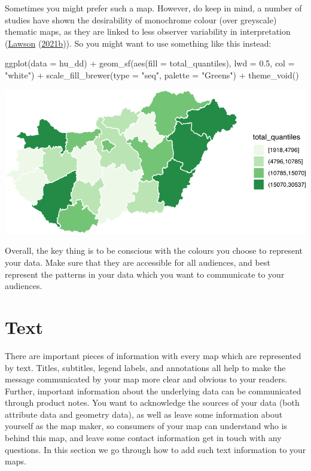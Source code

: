 \documentclass[
  krantz2]{krantz}
\makeatletter
\newenvironment{Shaded}{\begin{snugshade}}{\end{snugshade}}
\newcommand{\AttributeTok}[1]{\textcolor[rgb]{0.61,0.61,0.61}{#1}}
\newcommand{\FloatTok}[1]{\textcolor[rgb]{0.06,0.06,0.06}{#1}}
\newcommand{\FunctionTok}[1]{\textcolor[rgb]{0,0,0}{#1}}
\newcommand{\NormalTok}[1]{#1}
\newcommand{\SpecialCharTok}[1]{\textcolor[rgb]{0,0,0}{#1}}
\newcommand{\StringTok}[1]{\textcolor[rgb]{0.5,0.5,0.5}{#1}}
\newenvironment{kframe}{%
\medskip{}
\setlength{\fboxsep}{.8em}
 \def\at@end@of@kframe{}%
 \ifinner\ifhmode%
  \def\at@end@of@kframe{\end{minipage}}%
  \begin{minipage}{\columnwidth}%
 \fi\fi%
 \def\FrameCommand##1{\hskip\@totalleftmargin \hskip-\fboxsep
 \colorbox{shadecolor}{##1}\hskip-\fboxsep
     \hskip-\linewidth \hskip-\@totalleftmargin \hskip\columnwidth}%
 \MakeFramed {\advance\hsize-\width
   \@totalleftmargin\z@ \linewidth\hsize
   \@setminipage}}%
 {\par\unskip\endMakeFramed%
 \at@end@of@kframe}
\renewenvironment{Shaded}{\begin{kframe}}{\end{kframe}}
\makeatother
\begin{document}
Sometimes you might prefer such a map. However, do keep in mind, a number of studies have shown the desirability of monochrome colour (over greyscale) thematic maps, as they are linked to less observer variability in interpretation (\protect\hyperlink{ref-Lawson_2006}{Lawson} (\protect\hyperlink{ref-Lawson_2006}{2021b})). So you might want to use something like this instead:

\begin{Shaded}
\begin{Highlighting}[]
\FunctionTok{ggplot}\NormalTok{(}\AttributeTok{data =}\NormalTok{ hu\_dd) }\SpecialCharTok{+} 
  \FunctionTok{geom\_sf}\NormalTok{(}\FunctionTok{aes}\NormalTok{(}\AttributeTok{fill =}\NormalTok{ total\_quantiles), }\AttributeTok{lwd =} \FloatTok{0.5}\NormalTok{, }\AttributeTok{col =} \StringTok{"white"}\NormalTok{) }\SpecialCharTok{+} 
  \FunctionTok{scale\_fill\_brewer}\NormalTok{(}\AttributeTok{type =} \StringTok{"seq"}\NormalTok{, }\AttributeTok{palette =} \StringTok{"Greens"}\NormalTok{) }\SpecialCharTok{+} 
  \FunctionTok{theme\_void}\NormalTok{()}
\end{Highlighting}
\end{Shaded}

\includegraphics{crime_mapping_files/figure-latex/unnamed-chunk-159-1.pdf}

Overall, the key thing is to be conscious with the colours you choose to represent your data. Make sure that they are accessible for all audiences, and best represent the patterns in your data which you want to communicate to your audiences.

\hypertarget{text}{%
\section{Text}\label{text}}

There are important pieces of information with every map which are represented by text. Titles, subtitles, legend labels, and annotations all help to make the message communicated by your map more clear and obvious to your readers. Further, important information about the underlying data can be communicated through product notes. You want to acknowledge the sources of your data (both attribute data and geometry data), as well as leave some information about yourself as the map maker, so consumers of your map can understand who is behind this map, and leave some contact information get in touch with any questions. In this section we go through how to add such text information to your maps.
\end{document}
